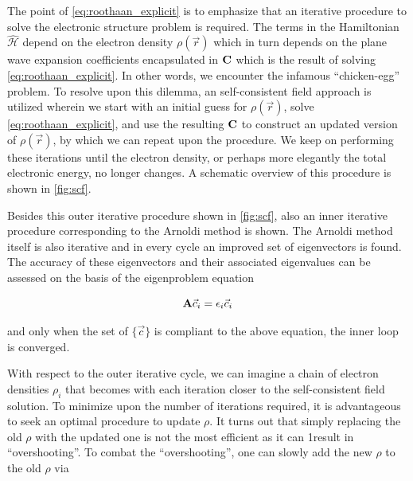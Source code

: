 The point of \cref{eq:roothaan_explicit} is to emphasize that an iterative procedure to solve the electronic structure problem is required. The terms in the Hamiltonian $\hat{\mathcal{H}}$ depend on the electron density $\rho(\vec{r})$ which in turn depends on the plane wave expansion coefficients encapsulated in $\mathbf{C}$ which is the result of solving \cref{eq:roothaan_explicit}. In other words, we encounter the infamous ``chicken-egg'' problem. To resolve upon this dilemma, an self-consistent field approach is utilized wherein we start with an initial guess for $\rho(\vec{r})$, solve \cref{eq:roothaan_explicit}, and use the resulting $\mathbf{C}$ to construct an updated version of $\rho(\vec{r})$, by which we can repeat upon the procedure. We keep on performing these iterations until the electron density, or perhaps more elegantly the total electronic energy, no longer changes. A schematic overview of this procedure is shown in \cref{fig:scf}.

\begin{Figure}
    \centering
    \resizebox{0.9 \textwidth}{!}{
        
    }
    \label{fig:scf}
\end{Figure}

Besides this outer iterative procedure shown in \cref{fig:scf}, also an inner iterative procedure corresponding to the Arnoldi method is shown. The Arnoldi method itself is also iterative and in every cycle an improved set of eigenvectors is found. The accuracy of these eigenvectors and their associated eigenvalues can be assessed on the basis of the eigenproblem equation

\begin{equation}
    \mathbf{A} \vec{c}_{i} = \epsilon_{i} \vec{c}_{i}
\end{equation}

and only when the set of $\{ \vec{c} \}$ is compliant to the above equation, the inner loop is converged.

With respect to the outer iterative cycle, we can imagine a chain of electron densities $\rho_{i}$ that becomes with each iteration closer to the self-consistent field solution. To minimize upon the number of iterations required, it is advantageous to seek an optimal procedure to update $\rho$. It turns out that simply replacing the old $\rho$ with the updated one is not the most efficient as it can 1result in ``overshooting''. To combat the ``overshooting'', one can slowly add the new $\rho$ to the old $\rho$ via

